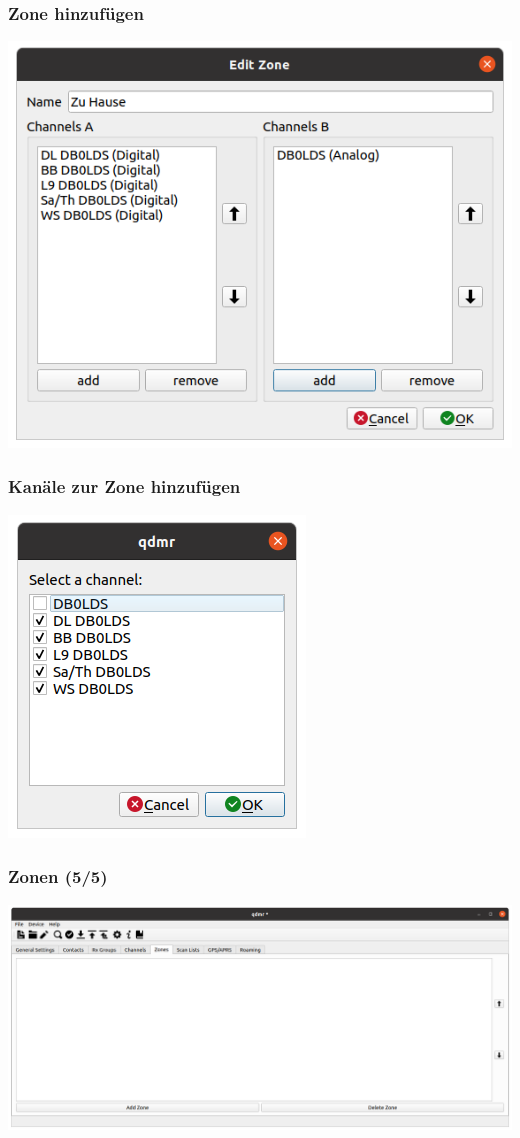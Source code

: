 \documentclass[aspectratio=169]{beamer}
\begin{document}
\begin{frame} \frametitle{Zone hinzufügen}
\begin{center}
 \includegraphics[width=0.5\linewidth]{../fig/qdmr-zone-edit.png}
\end{center}
\end{frame}

\begin{frame} \frametitle{Kanäle zur Zone hinzufügen}
\begin{center}
 \includegraphics[width=0.25\linewidth]{../fig/qdmr-zone-edit-select.png}
\end{center}
\end{frame}

\begin{frame} \frametitle{Zonen (5/5)}
\begin{center}
 \includegraphics[width=0.75\linewidth]{../fig/qdmr-zone-empty.png}
\end{center}
\end{frame}
\end{document}
